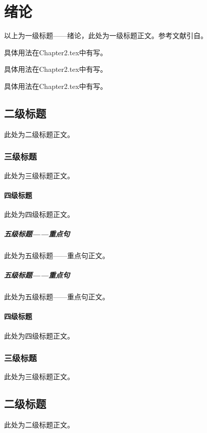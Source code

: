 
\chapter{绪论}%
以上为一级标题——绪论，此处为一级标题正文。参考文献引自\cite{tlc}。
\par 具体用法在Chapter2.tex中有写。
\par 具体用法在Chapter2.tex中有写。
\par 具体用法在Chapter2.tex中有写。
\section{二级标题}
此处为二级标题正文。
\subsection{三级标题}
此处为三级标题正文。
\subsubsection{四级标题}
此处为四级标题正文。
\paragraph{五级标题——重点句}
此处为五级标题——重点句正文。
\paragraph{五级标题——重点句}
此处为五级标题——重点句正文。
\subsubsection{四级标题}
此处为四级标题正文。
\subsection{三级标题}
此处为三级标题正文。
\section{二级标题}
此处为二级标题正文。
